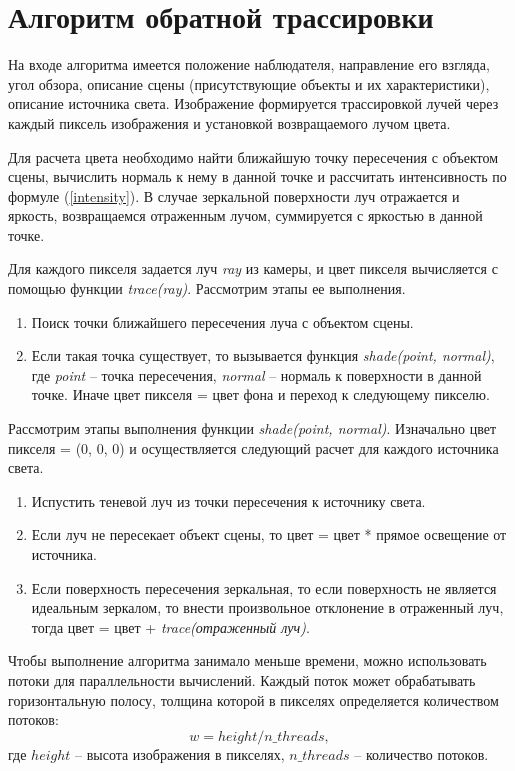 \section{Алгоритм обратной трассировки}

На входе алгоритма имеется положение наблюдателя, направление его взгляда, угол обзора, описание сцены (присутствующие объекты и их характеристики), описание источника света. Изображение формируется трассировкой лучей через каждый пиксель изображения и установкой возвращаемого лучом цвета.

Для расчета цвета необходимо найти ближайшую точку пересечения с объектом сцены, вычислить нормаль к нему в данной точке и рассчитать интенсивность по формуле (\ref{intensity}). В случае зеркальной поверхности луч отражается и яркость, возвращаемся отраженным лучом, суммируется с яркостью в данной точке.

Для каждого пикселя задается луч \textit{ray} из камеры, и цвет пикселя вычисляется с помощью функции \textit{trace(ray)}. Рассмотрим этапы ее выполнения.
\begin{enumerate}
	\item Поиск точки ближайшего пересечения луча с объектом сцены.
	\item Если такая точка существует, то вызывается функция \textit{shade(point, normal)}, где \textit{point} -- точка пересечения, \textit{normal} -- нормаль к поверхности в данной точке. Иначе цвет пикселя = цвет фона и переход к следующему пикселю.
\end{enumerate}

Рассмотрим этапы выполнения функции \textit{shade(point, normal)}. Изначально цвет пикселя = (0, 0, 0) и осуществляется следующий расчет для каждого источника света.
\begin{enumerate}
	\item Испустить теневой луч из точки пересечения к источнику света.
	\item Если луч не пересекает объект сцены, то цвет = цвет * прямое освещение от источника.
	\item Если поверхность пересечения зеркальная, то если поверхность не является идеальным зеркалом, то внести произвольное отклонение в отраженный луч, тогда цвет = цвет + \textit{trace(отраженный луч)}.
\end{enumerate}

Чтобы выполнение алгоритма занимало меньше времени, можно использовать потоки для параллельности вычислений. Каждый поток может обрабатывать горизонтальную полосу, толщина которой в пикселях определяется количеством потоков:
\begin{equation}
	w = height/ n\_threads,
\end{equation} 
где $height$ -- высота изображения в пикселях, $n\_threads$ -- количество потоков.

